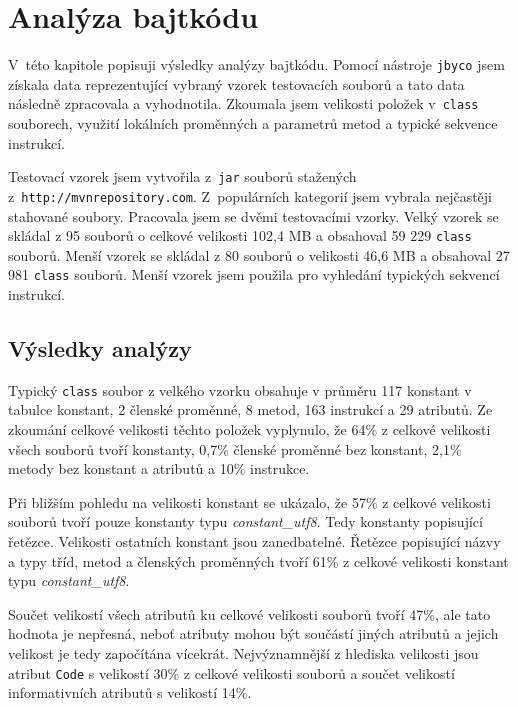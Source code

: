 \chapter{Analýza bajtkódu}\label{Analysis}


V~této kapitole popisuji výsledky analýzy bajtkódu. Pomocí nástroje \texttt{jbyco} jsem získala data reprezentující vybraný vzorek testovacích souborů a tato data následně zpracovala a vyhodnotila. Zkoumala jsem velikosti položek v~\texttt{class} souborech, využití lokálních proměnných a parametrů metod a typické sekvence instrukcí.

Testovací vzorek jsem vytvořila z~\texttt{jar} souborů stažených z~\texttt{http://mvnrepository.com}. Z~populárních kategorií jsem vybrala nejčastěji stahované soubory. Pracovala jsem se dvěmi testovacími vzorky. Velký vzorek se skládal z 95 souborů o celkové velikosti 102,4 MB a obsahoval 59 229 \texttt{class} souborů. Menší vzorek se skládal z 80 souborů o velikosti 46,6 MB a obsahoval 27 981
\texttt{class} souborů. Menší vzorek jsem použila pro vyhledání typických sekvencí instrukcí.

\section{Výsledky analýzy}\label{AnalysisResults}

Typický \texttt{class} soubor z velkého vzorku obsahuje v průměru 117 konstant v tabulce konstant, 2 členské proměnné, 8 metod, 163 instrukcí a 29 atributů. Ze zkoumání celkové velikosti těchto položek vyplynulo, že 64\% z celkové velikosti všech souborů tvoří konstanty, 0,7\% členské proměnné bez konstant, 2,1\% metody bez konstant a atributů a 10\% instrukce.

Při bližším pohledu na velikosti konstant se ukázalo, že 57\% z celkové velikosti souborů tvoří pouze konstanty typu \textit{constant\_utf8}. Tedy konstanty popisující řetězce. Velikosti ostatních konstant jsou zanedbatelné. Řetězce popisující názvy a typy tříd, metod a členských proměnných tvoří 61\% z celkové velikosti konstant typu \textit{constant\_utf8}.

Součet velikostí všech atributů ku celkové velikosti souborů tvoří 47\%, ale tato hodnota je nepřesná, neboť atributy mohou být součástí jiných atributů a jejich velikost je tedy započítána vícekrát. Nejvýznamnější z hlediska velikosti jsou atribut \texttt{Code} s velikostí 30\% z celkové velikosti souborů a součet velikostí informativních atributů s velikostí 14\%.

